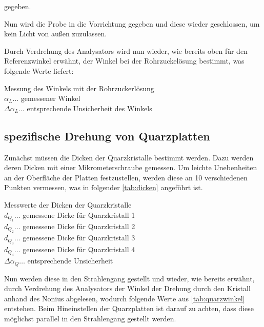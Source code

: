 \documentclass[11pt,ngerman]{scrartcl}
\begin{document}
gegeben.

\vspace{2mm}

Nun wird die Probe in die Vorrichtung gegeben und diese wieder geschlossen, um kein Licht von außen zuzulassen.

Durch Verdrehung des Analysators wird nun wieder, wie bereits oben für den Referenzwinkel erwähnt, der Winkel bei der Rohrzuckelösung bestimmt, was folgende Werte liefert:

\begin{table}[H]
	\caption{Messung des Winkels mit der Rohrzuckerlösung \\ $\alpha_L \dots$
		gemessener Winkel \\ $\Delta\alpha_L \dots$ entsprechende Unsicherheit des
		Winkels}
	\label{tab:loswinkel}
	\centering
	
\end{table}

\newpage

\subsection{spezifische Drehung von Quarzplatten}

Zunächst müssen die Dicken der Quarzkristalle bestimmt werden. Dazu werden deren Dicken mit einer Mikrometerschraube gemessen. Um leichte Unebenheiten an der Oberfläche der Platten festzustellen, werden diese an 10 verschiedenen Punkten vermessen, was in folgender \autoref{tab:dicken} angeführt ist.

\begin{table}[H]
	\caption{Messwerte der Dicken der Quarzkristalle \\ $d_{Q_1} \dots$ gemessene
		Dicke für Quarzkristall 1 \\ $d_{Q_2} \dots$ gemessene Dicke für
		Quarzkristall 2\\ $d_{Q_3} \dots$ gemessene Dicke für Quarzkristall 3\\
		$d_{Q_4} \dots$ gemessene Dicke für Quarzkristall 4 \\ $\Delta \alpha_{Q} \dots$
		entsprechende Unsicherheit}
	\label{tab:dicken}
	\centering
	
\end{table}

Nun werden diese in den Strahlengang gestellt und wieder, wie bereits erwähnt,
durch Verdrehung des Analysators der Winkel der Drehung durch den Kristall
anhand des Nonius abgelesen, wodurch folgende Werte aus
\autoref{tab:quarzwinkel} entstehen. Beim Hineinstellen der Quarzplatten ist
darauf zu achten, dass diese möglichst parallel in den Strahlengang gestellt
werden.
\end{document}
